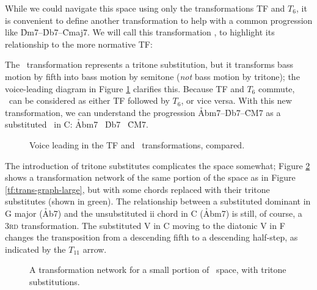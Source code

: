 While we could navigate this space using only the transformations TF and
$T_6$, it is convenient to define another transformation to help with a common
progression like \h{Dm7}--\h{Db7}--\h{Cmaj7}. We will call this
transformation \tft, to highlight its relationship to the more normative TF:
%
{%
%
The \tft\ transformation represents a tritone substitution, but it
transforms bass motion by fifth into bass motion by semitone (\emph{not} bass
motion by tritone); the voice-leading diagram in Figure
\ref{tft:voice-leading-tft} clarifies this. Because TF and $T_6$ commute,
\tft\ can be considered as either TF followed by $T_6$, or vice versa. With
this new transformation, we can understand the progression
\h{Abm7}--\h{Db7}--\h{CM7} as a substituted \tfo\ in C: \h{Abm7} \TFarrow\
\h{Db7} \TFTarrow\ \h{CM7}.

\begin{figure}[htbp]
  \caption{Voice leading in the TF and \tft\ transformations, compared.}
  \label{tft:voice-leading-tft}
\end{figure}

The introduction of tritone substitutes complicates the space somewhat; Figure
\ref{tft:tft-space-extract} shows a transformation network of the same portion
of the space as in Figure \ref{tf:trans-graph-large}, but with some chords
replaced with their tritone substitutes (shown in green).\fn{tft-2b} The relationship
between a substituted dominant in G major (\h{Ab7}) and the unsubstituted ii
chord in C (\h{Abm7}) is still, of course, a \textsc{3rd} transformation. The
substituted V in C moving to the diatonic V\tsup{7} in F changes the
transposition from a descending fifth to a descending half-step, as indicated
by the $T_{11}$ arrow.

\begin{figure}[tbp]
  \caption{A transformation network for a small portion of \tf\ space, with
    tritone substitutions.}
  \label{tft:tft-space-extract}
\end{figure}

}
